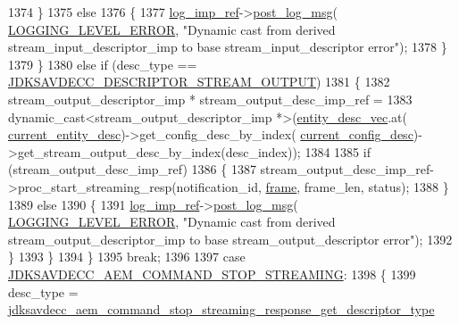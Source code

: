 \begin{DoxyCode}
{{{1374             \}
1375             \textcolor{keywordflow}{else}
1376             \{
1377                 \hyperlink{namespaceavdecc__lib_acbe3e2a96ae6524943ca532c87a28529}{log\_imp\_ref}->\hyperlink{classavdecc__lib_1_1log_a68139a6297697e4ccebf36ccfd02e44a}{post\_log\_msg}(
      \hyperlink{namespaceavdecc__lib_a501055c431e6872ef46f252ad13f85cdaf2c4481208273451a6f5c7bb9770ec8a}{LOGGING\_LEVEL\_ERROR}, \textcolor{stringliteral}{"Dynamic cast from derived stream\_input\_descriptor\_imp to base
       stream\_input\_descriptor error"});
1378             \}
1379         \}
1380         \textcolor{keywordflow}{else} \textcolor{keywordflow}{if} (desc\_type == \hyperlink{group__descriptor_gab458eb4963f42bfa5591d5dd604bedce}{JDKSAVDECC\_DESCRIPTOR\_STREAM\_OUTPUT})
1381         \{
1382             stream\_output\_descriptor\_imp * stream\_output\_desc\_imp\_ref =
1383                 \textcolor{keyword}{dynamic\_cast<}stream\_output\_descriptor\_imp *\textcolor{keyword}{>}(\hyperlink{classavdecc__lib_1_1end__station__imp_a72edab41bc56e3c1757944a7df188a3d}{entity\_desc\_vec}.at(
      \hyperlink{classavdecc__lib_1_1end__station__imp_afd78c89df26ba7641e1adb764c0e827d}{current\_entity\_desc})->get\_config\_desc\_by\_index(
      \hyperlink{classavdecc__lib_1_1end__station__imp_a60b1af40d35e8a86b0082c54ab6cb6a8}{current\_config\_desc})->get\_stream\_output\_desc\_by\_index(desc\_index));
1384 
1385             \textcolor{keywordflow}{if} (stream\_output\_desc\_imp\_ref)
1386             \{
1387                 stream\_output\_desc\_imp\_ref->proc\_start\_streaming\_resp(notification\_id, 
      \hyperlink{gst__avb__playbin_8c_ac8e710e0b5e994c0545d75d69868c6f0}{frame}, frame\_len, status);
1388             \}
1389             \textcolor{keywordflow}{else}
1390             \{
1391                 \hyperlink{namespaceavdecc__lib_acbe3e2a96ae6524943ca532c87a28529}{log\_imp\_ref}->\hyperlink{classavdecc__lib_1_1log_a68139a6297697e4ccebf36ccfd02e44a}{post\_log\_msg}(
      \hyperlink{namespaceavdecc__lib_a501055c431e6872ef46f252ad13f85cdaf2c4481208273451a6f5c7bb9770ec8a}{LOGGING\_LEVEL\_ERROR}, \textcolor{stringliteral}{"Dynamic cast from derived stream\_output\_descriptor\_imp to base
       stream\_output\_descriptor error"});
1392             \}
1393         \}
1394     \}
1395     \textcolor{keywordflow}{break};
1396 
1397     \textcolor{keywordflow}{case} \hyperlink{group__command_ga662d8e95498967710f7f3a281987fd6c}{JDKSAVDECC\_AEM\_COMMAND\_STOP\_STREAMING}:
1398     \{
1399         desc\_type = 
      \hyperlink{group__command__stop__streaming__response_ga34b89a4a83a1b2095386c25db82b29cd}{jdksavdecc\_aem\_command\_stop\_streaming\_response\_get\_descriptor\_type}
}}}
\end{DoxyCode}
